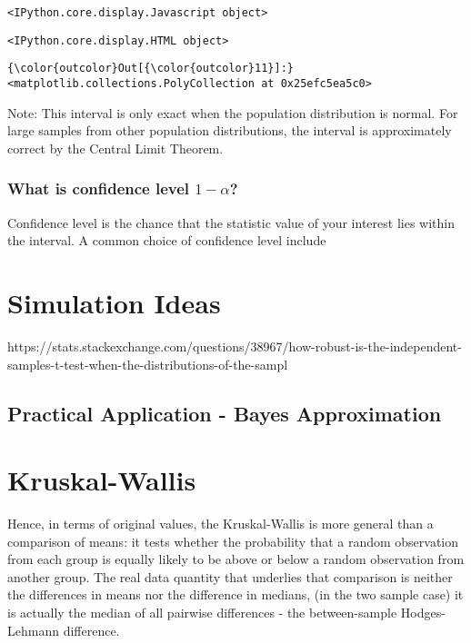\documentclass[11pt]{article}
\begin{document}
    
    \begin{verbatim}
<IPython.core.display.Javascript object>
    \end{verbatim}

    
    
    \begin{verbatim}
<IPython.core.display.HTML object>
    \end{verbatim}

    
\begin{Verbatim}[commandchars=\\\{\}]
{\color{outcolor}Out[{\color{outcolor}11}]:} <matplotlib.collections.PolyCollection at 0x25efc5ea5c0>
\end{Verbatim}
            
    Note: This interval is only exact when the population distribution is
normal. For large samples from other population distributions, the
interval is approximately correct by the Central Limit Theorem.

    \subsubsection{\texorpdfstring{What is confidence level
\(1 - \alpha\)?}{What is confidence level 1 - \textbackslash{}alpha?}}\label{what-is-confidence-level-1---alpha}

Confidence level is the chance that the statistic value of your interest
lies within the interval. A common choice of confidence level include

    \section{Simulation Ideas}\label{simulation-ideas}

https://stats.stackexchange.com/questions/38967/how-robust-is-the-independent-samples-t-test-when-the-distributions-of-the-sampl

    \subsection{Practical Application - Bayes
Approximation}\label{practical-application---bayes-approximation}

    \section{Kruskal-Wallis}\label{kruskal-wallis}

Hence, in terms of original values, the Kruskal-Wallis is more general
than a comparison of means: it tests whether the probability that a
random observation from each group is equally likely to be above or
below a random observation from another group. The real data quantity
that underlies that comparison is neither the differences in means nor
the difference in medians, (in the two sample case) it is actually the
median of all pairwise differences - the between-sample Hodges-Lehmann
difference.
\end{document}
